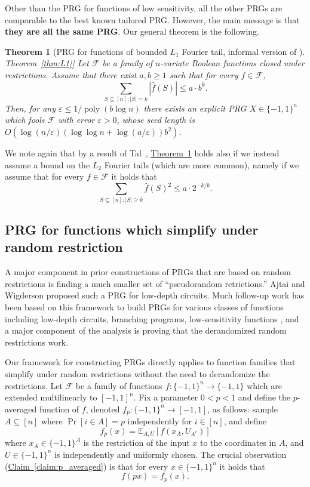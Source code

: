 \documentclass[11pt]{article}
\numberwithin{equation}{section}
\newtheorem{theorem}{Theorem}[section]
\theoremstyle{definition}
\theoremstyle{plain}
\newcommand{\expref}[2]{\hyperref[#2]{#1~\ref{#2}}}
\newcommand{\E}{\mathbb{E}}
\newcommand{\FF}{\mathcal{F}}
\newcommand{\eps}{\varepsilon}
\DeclareMathOperator{\poly}{poly}      %
\begin{document}
Other than the PRG for functions of low sensitivity, all the other PRGs are comparable to the best known tailored PRG\@. However, the main message
is that {\bf they are all the same PRG}. Our general theorem is the following.

\begin{theorem}[PRG for functions of bounded $L_1$ Fourier tail, informal version of \expref{Theorem}{thm:L1}]
\label{thm:L1_informal}
Let $\FF$ be a family of $n$-variate Boolean functions closed under restrictions.
Assume that there exist $a,b \ge 1$ such that for every $f \in \FF$,
$$
\sum_{S \subseteq [n]: |S|=k} |\hat{f}(S)| \le a \cdot b^k.
$$
Then, for any $ \eps\leq {1}/{\poly(b \log n)}$ there exists an explicit PRG $X \in \{-1,1\}^n$ which fools $\FF$ with error $\eps>0$,
whose seed length is $O(\log(n/\eps)  (\log\log n + \log(a/\eps)) b^2)$.
\end{theorem}

%
%
We note again that by a result of Tal~\cite{tal2017tight}, \expref{Theorem}{thm:L1_informal} holds also if we instead assume a bound on the $L_2$ Fourier tails
(which are more common), namely if we assume that for every
$f \in \FF$ it holds that
$$
\sum_{S \subseteq [n]: |S| \ge k} \hat{f}(S)^2 \le a \cdot 2^{-k/b}.
$$

\subsection{PRG for functions which simplify under random restriction}
A major component in prior constructions of PRGs that are based on random restrictions is finding a much smaller set of ``pseudorandom retrictions.'' Ajtai and Wigderson \cite{ajtai1985deterministic} proposed such a PRG for
%
low-depth circuits.   %
%
Much follow-up work has been  %
based on this framework to build PRGs for various classes of functions including
%
low-depth      %
circuits, branching programs, low-sensitivity functions \cite{trevisan2013derandomized,gopalan2012better,reingold2013pseudorandomness,chattopadhyay2018improved, hatami2017pseudorandom}, and  a major component of the analysis is proving that the derandomized random restrictions work.

Our framework for constructing PRGs directly applies to function families that simplify under random restrictions without the need to derandomize the restrictions.  Let $\FF$ be a family of functions  $f:\{-1,1\}^n \to \{-1,1\}$  which are extended multilinearly to $[-1,1]^n$. Fix a parameter $0<p<1$ and define the $p$-averaged function of $f$, denoted $f_p:\{-1,1\}^n \to [-1,1]$, as follows:
sample $A \subseteq [n]$ where $\Pr[i \in A]=p$ independently for $i \in [n]$, and define
$$f_p(x) = \E_{A,U} [f(x_A,U_{A^c})]$$
where $x_A \in \{-1,1\}^A$ is the restriction of the input $x$ to the coordinates in $A$, and $U \in \{-1,1\}^n$ is independently and uniformly chosen. The crucial observation (\expref{Claim}{claim:p_averaged})
is that for every $x \in \{-1,1\}^n$ it holds that
$$
f(px) = f_p(x).
$$
\end{document}
